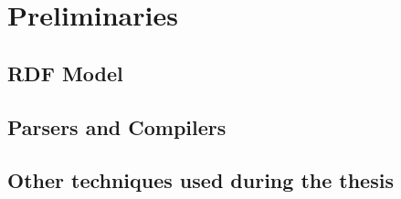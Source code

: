\chapter{Preliminaries}
\label{ch:preliminaries}
\newpage

\section{RDF Model}

\section{Parsers and Compilers}
\section{Other techniques used during the thesis}

















